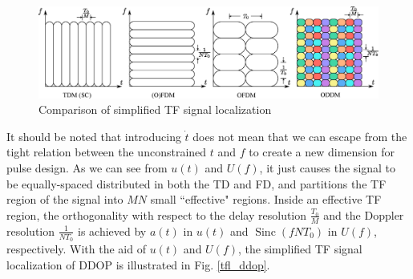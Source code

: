 \documentclass[journal]{IEEEtran}
\DeclareMathOperator{\sinc}{Sinc}
\begin{document}
\begin{figure}
  \centering
  \includegraphics[width=\linewidth]{oddm_vs_others_c4}
  \caption{Comparison of simplified TF signal localization}
  \label{cms}
\end{figure}

It should be noted that introducing $\dot t$ does not mean that we can escape from the tight relation between the unconstrained $t$ and $f$ to create a new dimension for pulse design. As we can see from $u(t)$ and $U(f)$, it just causes the signal to be {equally-spaced} distributed in both the TD and FD, and partitions the TF region of the signal into $MN$ small ``effective" regions.
Inside an effective TF region, the orthogonality with respect to the delay resolution $\frac{T_0}{M}$ and the Doppler resolution $\frac{1}{NT_0}$ is achieved by $a(t)$ in $u(t)$ and $\sinc(fNT_0)$ in $U(f)$, respectively. With the aid of $u(t)$ and $U(f)$, the simplified TF signal localization of DDOP is illustrated in Fig. \ref{tfl_ddop}.
\end{document}
